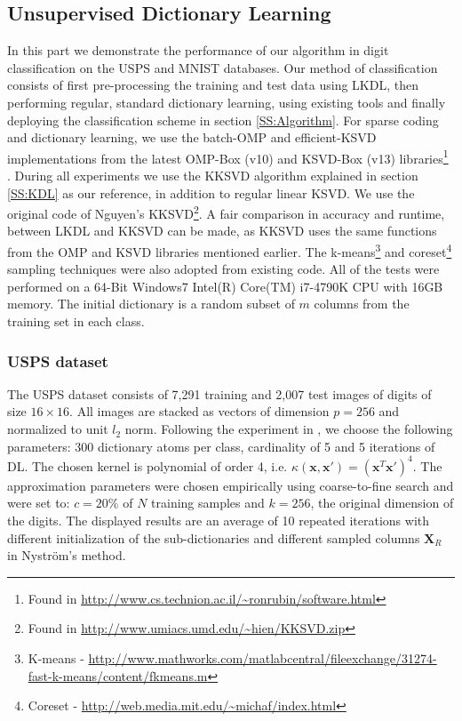 \documentclass[journal]{IEEEtran}
\newcommand{\bx}{\mathbf{x}}
\newcommand{\bX}{\mathbf{X}}
\begin{document}
\subsection{Unsupervised Dictionary Learning} \label{SS:Unsupervised}

In this part we demonstrate the performance of our algorithm in digit classification on the USPS and MNIST databases. Our method of classification consists of first pre-processing the training and test data using LKDL, then performing regular, standard dictionary learning, using existing tools and finally deploying the classification scheme in section \ref{SS:Algorithm}. For sparse coding and dictionary learning, we use the batch-OMP and efficient-KSVD implementations from the latest OMP-Box (v10) and KSVD-Box (v13) libraries\footnote{Found in \url{http://www.cs.technion.ac.il/~ronrubin/software.html}} \cite{EfficientKSVD}.
During all experiments we use the KKSVD algorithm explained in section \ref{SS:KDL} \cite{KDL,KDL2} as our reference, in addition to regular linear KSVD. We use the original code of Nguyen's KKSVD\footnote{Found in \url{http://www.umiacs.umd.edu/~hien/KKSVD.zip}}. A fair comparison in accuracy and runtime, between LKDL and KKSVD can be made, as KKSVD uses the same functions from the OMP and KSVD libraries mentioned earlier. The k-means\footnote{K-means - \url{http://www.mathworks.com/matlabcentral/fileexchange/31274-fast-k-means/content/fkmeans.m}} and coreset\footnote{Coreset - \url{http://web.media.mit.edu/~michaf/index.html}} sampling techniques were also adopted from existing code. All of the tests were performed on a 64-Bit Windows7 Intel(R) Core(TM) i7-4790K CPU with 16GB memory.
The initial dictionary is a random subset of $m$ columns from the training set in each class.

\subsubsection{USPS dataset}\label{SSS:USPS}

The USPS dataset consists of 7,291 training and 2,007 test images of digits of size $16 \times 16$. All images are stacked as vectors of dimension $p=256$ and normalized to unit $l_2$ norm. Following the experiment in \cite{KDL2}, we choose the following parameters: 300 dictionary atoms per class, cardinality of 5 and 5 iterations of DL. The chosen kernel is polynomial of order 4, i.e. $\kappa(\bx,\bx')=(\bx^T\bx')^4$. The approximation parameters were chosen empirically using coarse-to-fine search and were set to: $c=20\%$ of $N$ training samples and $k=256$, the original dimension of the digits. The displayed results are an average of 10 repeated iterations with different initialization of the sub-dictionaries and different sampled columns $\bX_R$ in Nystr\"{o}m's method.
\end{document}
